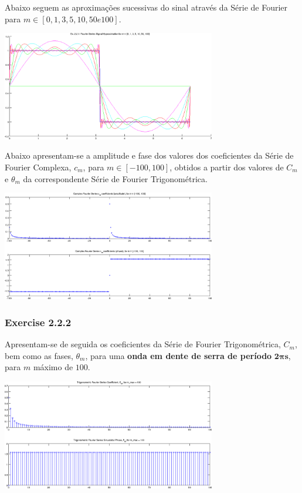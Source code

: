 \documentclass[a4paper]{article}
\begin{document}
\noindent Abaixo seguem as aproximações sucessivas do sinal através da Série de Fourier para $m \in [0, 1, 3, 5, 10, 50 e 100]$.
\begin{center}
	\includegraphics[width=0.70\textwidth]{images/ex2_2_1_approx.png}
	\label{fig:ex2_2_1_approx}
\end{center}

\noindent Abaixo apresentam-se a amplitude e fase dos valores dos coeficientes da Série de Fourier Complexa, $c_m$, para $m \in [-100, 100]$, obtidos a partir dos valores de $C_m$ e $\theta_m$ da correspondente Série de Fourier Trigonométrica.
\begin{center}
	\includegraphics[width=0.70\textwidth]{images/ex2_2_1_complex_cm.png}
	\label{fig:ex2_2_1_complex_cm}
\end{center}

\subsubsection{Exercise 2.2.2}
\noindent Apresentam-se de seguida os coeficientes da Série de Fourier Trigonométrica, $C_m$, bem como as fases, $\theta_m$, para uma \textbf{onda em dente de serra de período} $\mathbf{2 \pi s}$, para $m$ máximo de $100$.

\begin{center}
	\includegraphics[width=0.70\textwidth]{images/ex2_2_2_cm_tm.png}
	\label{fig:ex2_2_2_cm_tm}
\end{center}
\end{document}
